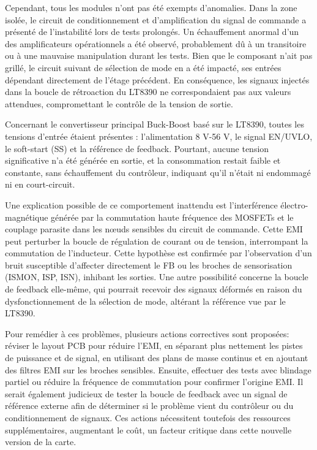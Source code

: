 Cependant, tous les modules n'ont pas été exempts d'anomalies. Dans la zone isolée, le circuit de conditionnement et d'amplification du signal de commande a présenté de l'instabilité lors de tests prolongés. Un échauffement anormal d'un des amplificateurs opérationnels a été observé, probablement dû à un transitoire ou à une mauvaise manipulation durant les tests. Bien que le composant n'ait pas grillé, le circuit suivant de sélection de mode en a été impacté, ses entrées dépendant directement de l'étage précédent. En conséquence, les signaux injectés dans la boucle de rétroaction du LT8390 ne correspondaient pas aux valeurs attendues, compromettant le contrôle de la tension de sortie.

Concernant le convertisseur principal Buck-Boost basé sur le LT8390, toutes les tensions d'entrée étaient présentes : l'alimentation 8 V-56 V, le signal EN/UVLO, le soft-start (SS) et la référence de feedback. Pourtant, aucune tension significative n'a été générée en sortie, et la consommation restait faible et constante, sans échauffement du contrôleur, indiquant qu'il n'était ni endommagé ni en court-circuit.

Une explication possible de ce comportement inattendu est l'interférence électro-\\magnétique générée par la commutation haute fréquence des MOSFETs et le couplage parasite dans les nœuds sensibles du circuit de commande. Cette EMI peut perturber la boucle de régulation de courant ou de tension, interrompant la commutation de l'inducteur. Cette hypothèse est confirmée par l'observation d'un bruit susceptible d'affecter directement le FB ou les broches de sensorisation (ISMON, ISP, ISN), inhibant les sorties. Une autre possibilité concerne la boucle de feedback elle-même, qui pourrait recevoir des signaux déformés en raison du dysfonctionnement de la sélection de mode, altérant la référence vue par le LT8390.

Pour remédier à ces problèmes, plusieurs actions correctives sont proposées: réviser le layout PCB pour réduire l'EMI, en séparant plus nettement les pistes de puissance et de signal, en utilisant des plans de masse continus et en ajoutant des filtres EMI sur les broches sensibles. Ensuite, effectuer des tests avec blindage partiel ou réduire la fréquence de commutation pour confirmer l'origine EMI. Il serait également judicieux de tester la boucle de feedback avec un signal de référence externe afin de déterminer si le problème vient du contrôleur ou du conditionnement de signaux. Ces actions nécessitent toutefois des ressources supplémentaires, augmentant le coût, un facteur critique dans cette nouvelle version de la carte.

